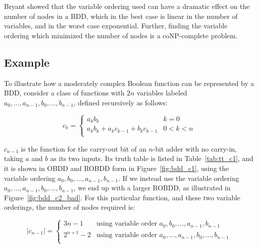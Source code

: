 \documentclass[a4paper,11pt]{kth-mag}
\begin{document}
Bryant showed that the variable ordering used can have a dramatic effect on the number of nodes in a BDD, which in the best case is linear in the number of variables, and in the worst case exponential.
Further, finding the variable ordering which minimized the number of nodes is a coNP-complete problem. %

\subsection{Example}

To illustrate how a moderately complex Boolean function can be represented by a BDD, consider a class of functions with $2n$ variables labeled $a_0,...,a_{n-1},b_0,...,b_{n-1}$, defined recursively as follows:

$$
  c_k = \left\{
  \begin{array}{ll}
    a_k b_k                             & k = 0 \\
    a_k b_k + a_k c_{k-1} + b_k c_{k-1} & 0 < k < n \\
  \end{array}\right.
$$

$c_{n-1}$ is the function for the carry-out bit of an $n$-bit adder with no carry-in, taking $a$ and $b$ as its two inputs.
Its truth table is listed in Table~\ref{tab:tt_c1}, and it is shown in OBDD and ROBDD form in Figure~\ref{fig:bdd_c1}, using the variable ordering $a_0,b_0,...,a_{n-1},b_{n-1}$.
If we instead use the variable ordering $a_0,...,a_{n-1},b_0,...,b_{n-1}$, we end up with a larger ROBDD, as illustrated in Figure~\ref{fig:bdd_c2_bad}.
For this particular function, and these two variable orderings, the number of nodes required is:

$$
  |c_{n-1}| = \left\{
  \begin{array}{ll}
    3n-1      & \textrm{using variable order $a_0,b_0,...,a_{n-1},b_{n-1}$} \\
    2^{n+1}-2 & \textrm{using variable order $a_0,...,a_{n-1},b_0,...,b_{n-1}$} \\
  \end{array}\right.
$$
\end{document}
